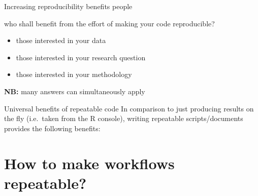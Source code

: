 \documentclass[
  ignorenonframetext,
  aspectratio=169,
  t]{beamer}
\providecommand{\tightlist}{%
  \setlength{\itemsep}{0pt}\setlength{\parskip}{0pt}}
\begin{document}
\begin{frame}{Increasing reproducibility benefits people}
\begin{block}{who shall benefit from the effort of making your code
reproducible?}
\begin{itemize}
  \begin{itemize}
  \tightlist
  \item[$\square$]
    those interested in your data
  \item[$\square$]
    those interested in your research question
  \item[$\square$]
    those interested in your methodology
  \end{itemize}
\end{itemize}

\pause

\textbf{NB:} many answers can simultaneously apply
\end{block}
\end{frame}

\begin{frame}{Universal benefits of repeatable code}
\protect{}\label{universal-benefits-of-repeatable-code}
In comparison to just producing results on the fly (i.e.~taken from the
R console), writing repeatable scripts/documents provides the following
benefits:

\end{frame}

\section{How to make workflows
repeatable?}\label{how-to-make-workflows-repeatable}
\end{document}
